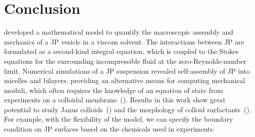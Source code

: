 \documentclass[lineno]{jfm}
\begin{document}
\section{\label{conclusion}Conclusion}

\cite{Fu20} developed a mathematical model to quantify the macroscopic
assembly and mechanics of a JP vesicle in a viscous solvent. The
interactions between JP are formulated as a second-kind integral
equation, which is coupled to the Stokes equations for the surrounding
incompressible fluid at the zero-Reynolds-number limit. Numerical
simulations of a JP suspension revealed self-assembly of JP into
micelles and bilayers, providing an alternative means for computing
mechanical moduli, which often requires the knowledge of an equation of
state from experiments on a colloidal
membrane~(\cite{Balchunas2019_SM}).
%
%
Results in this work show great potential to study Janus colloids~(\cite{Bradley2017,Mallory2017}) and the morphology of colloid
surfactants~(\cite{Bradley2016}). 
%
For example, with the flexibility of the model, we can specify the
boundary condition on JP surfaces based on the chemicals used in
experiments.

\end{document}
